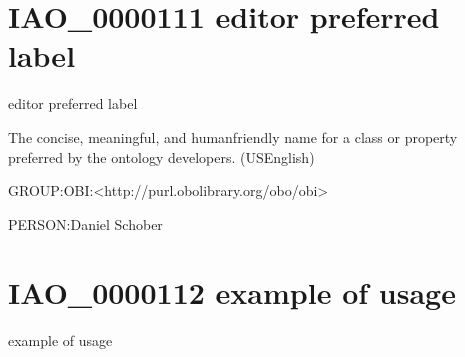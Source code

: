 \documentclass[letterpaper,10pt,english]{sphinxmanual}
\begin{document}
\section{IAO\_0000111 \sphinxhyphen{} editor preferred label}
\label{\detokenize{doc-IAO_0000111:iao-0000111-editor-preferred-label}}\label{\detokenize{doc-IAO_0000111:index-0}}\label{\detokenize{doc-IAO_0000111::doc}}
\begin{sphinxShadowBox}

\sphinxAtStartPar
editor preferred label
\end{sphinxShadowBox}

\begin{sphinxShadowBox}

\sphinxAtStartPar
The concise, meaningful, and human\sphinxhyphen{}friendly name for a class or property preferred by the ontology developers. (US\sphinxhyphen{}English)
\end{sphinxShadowBox}

\begin{sphinxShadowBox}

\sphinxAtStartPar
GROUP:OBI:\textless{}http://purl.obolibrary.org/obo/obi\textgreater{}
\end{sphinxShadowBox}

\begin{sphinxShadowBox}

\sphinxAtStartPar
PERSON:Daniel Schober
\end{sphinxShadowBox}
\begin{quote}
\label{\detokenize{doc-IAO_0000112:iao-0000112}}\label{\detokenize{doc-IAO_0000112:example-of-usage}}\label{\detokenize{doc-IAO_0000112:iao-0000112}}
\ignorespaces \end{quote}


\section{IAO\_0000112 \sphinxhyphen{} example of usage}
\label{\detokenize{doc-IAO_0000112:iao-0000112-example-of-usage}}\label{\detokenize{doc-IAO_0000112:index-0}}\label{\detokenize{doc-IAO_0000112::doc}}
\begin{sphinxShadowBox}

\sphinxAtStartPar
example of usage
\end{sphinxShadowBox}
\end{document}
